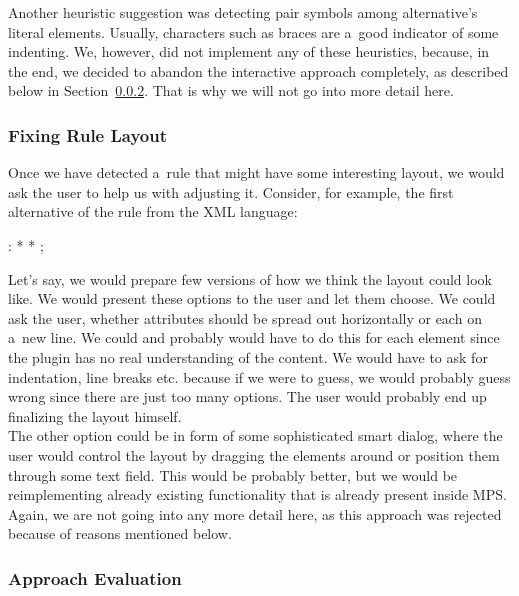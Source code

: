 Another heuristic suggestion was detecting pair symbols among alternative's literal elements.
Usually, characters such as braces are a~good indicator of some indenting.
We, however, did not implement any of these heuristics, because, in the end, we decided to abandon the interactive approach completely, as described below in Section~\ref{chap:interactive_approach_evaluation}.
That is why we will not go into more detail here.

\subsubsection{Fixing Rule Layout}

Once we have detected a~rule that might have some interesting layout, we would ask the user to help us with adjusting it.
Consider, for example, the first alternative of the  rule from the XML language:

\begin{antlr}
	  :   \literal{<}  * \literal{>} * \literal{</}  \literal{>} ;
\end{antlr}

Let's say, we would prepare few versions of how we think the layout could look like.
We would present these options to the user and let them choose.
We could ask the user, whether attributes should be spread out horizontally or each on a~new line.
We could and probably would have to do this for each element since the plugin has no real understanding of the content.
We would have to ask for indentation, line breaks etc. because if we were to guess, we would probably guess wrong since there are just too many options.
The user would probably end up finalizing the layout himself.
\\

The other option could be in form of some sophisticated smart dialog, where the user would control the layout by dragging the elements around or position them through some text field.
This would be probably better, but we would be reimplementing already existing functionality that is already present inside MPS.
Again, we are not going into any more detail here, as this approach was rejected because of reasons mentioned below.

\subsubsection{Approach Evaluation}
\label{chap:interactive_approach_evaluation}


